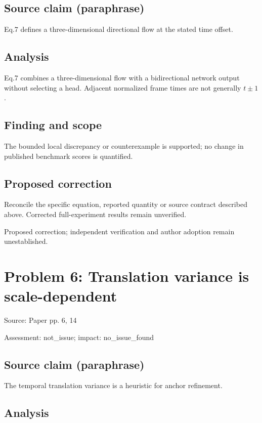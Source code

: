 \documentclass[11pt]{article}
\begin{document}
\subsection*{Source claim (paraphrase)}

Eq.7 defines a three-dimensional directional flow at the stated time offset.

\subsection*{Analysis}

Eq.7 combines a three-dimensional flow with a bidirectional network output without selecting a head. Adjacent normalized frame times are not generally \(t\pm1\).

\subsection*{Finding and scope}

The bounded local discrepancy or counterexample is supported; no change in published benchmark scores is quantified.

\subsection*{Proposed correction}

Reconcile the specific equation, reported quantity or source contract described above. Corrected full-experiment results remain unverified.

Proposed correction; independent verification and author adoption remain unestablished.

\section*{Problem 6: Translation variance is scale-dependent}

Source: Paper pp. 6, 14

Assessment: not\_issue; impact: no\_issue\_found

\subsection*{Source claim (paraphrase)}

The temporal translation variance is a heuristic for anchor refinement.

\subsection*{Analysis}
\end{document}
